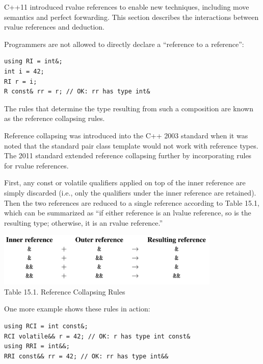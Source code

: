 

C++11 introduced rvalue references to enable new techniques, including move semantics and perfect forwarding. This section describes the interactions between rvalue references and deduction.


Programmers are not allowed to directly declare a “reference to a reference”:

\begin{lstlisting}[style=styleCXX]
using RI = int&;
int i = 42;
RI r = i;
R const& rr = r; // OK: rr has type int&
\end{lstlisting}

The rules that determine the type resulting from such a composition are known as the reference collapsing rules.

\begin{tcolorbox}[colback=webgreen!5!white,colframe=webgreen!75!black]
\hspace*{0.75cm}Reference collapsing was introduced into the C++ 2003 standard when it was noted that the standard pair class template would not work with reference types. The 2011 standard extended reference collapsing further by incorporating rules for rvalue references.
\end{tcolorbox}

First, any const or volatile qualifiers applied on top of the inner reference are simply discarded (i.e., only the qualifiers under the inner reference are retained). Then the two references are reduced to a single reference according to Table 15.1, which can be summarized as “if either reference is an lvalue reference, so is the resulting type; otherwise, it is an rvalue reference.”

\begin{center}
\includegraphics[width=0.8\textwidth]{content/2/chapter15/images/15.1.png} \\
Table 15.1. Reference Collapsing Rules
\end{center}

One more example shows these rules in action:

\begin{lstlisting}[style=styleCXX]
using RCI = int const&;
RCI volatile&& r = 42; // OK: r has type int const&
using RRI = int&&;
RRI const&& rr = 42; // OK: rr has type int&&
\end{lstlisting}


